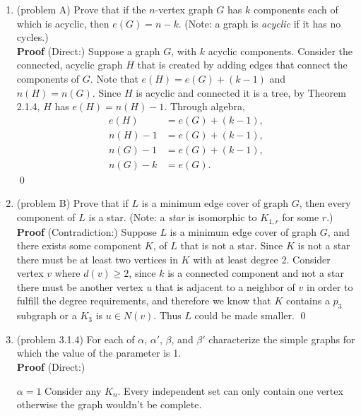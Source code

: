 \documentclass{amsart}
\begin{document}
\thispagestyle{fancy}
 
\begin{enumerate}
\item (problem A) Prove that if the $n$-vertex graph $G$ has $k$ components each of which is acyclic, then $e(G)= n-k.$ (Note: a graph is \emph{acyclic} if it has no cycles.)\\

\textbf{Proof} (Direct:) Suppose a graph $G$, with $k$ acyclic components. Consider the connected, acyclic graph $H$ that is created by adding edges that connect the components of $G$. Note that $e(H) = e(G) + (k-1)$ and $n(H) = n(G)$. Since $H$ is acyclic and connected it is a tree, by Theorem 2.1.4, $H$ has $e(H) = n(H) - 1$. Through algebra,
\begin{align*}
e(H) &= e(G) + (k-1),\\
n(H) - 1 &= e(G) + (k-1),\\
 n(G)- 1 &= e(G) + (k-1),\\
n(G) - k&= e(G).
\end{align*}
\qed

\vspace{1.5in}

\item (problem B) Prove that if $L$ is a minimum edge cover of graph $G$, then every component of $L$ is a star. (Note: a \emph{star} is isomorphic to $K_{1,r}$ for some $r.$)\\

\textbf{Proof} (Contradiction:) Suppose $L$ is a minimum edge cover of graph $G$, and there exists some component $K$, of $L$ that is not a star. Since $K$ is not a star there must be at least two vertices in $K$ with at least degree 2. Consider vertex $v$ where $d(v)\geq 2$, since $k$ is a connected component and not a star there must be another vertex $u$ that is adjacent to a neighbor of $v$ in order to fulfill the degree requirements, and therefore we know that $K$ contains a $p_3$ subgraph or a $K_3$ is $u \in N(v)$. Thus $L$ could be made smaller.
\qed
\vspace{1.5in} 

\item (problem 3.1.4) For each of $\alpha$, $\alpha'$, $\beta$, and $\beta'$ characterize the simple graphs for which the value of the parameter is 1.\\

\textbf{Proof} (Direct:)

$\alpha = 1$ Consider any $K_n$. Every independent set can only contain one vertex otherwise the graph wouldn't be complete.\\


\end{enumerate}
\end{document}
